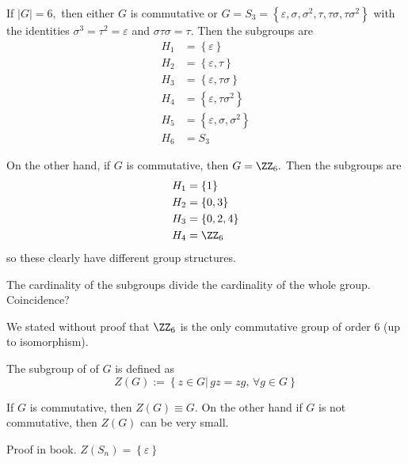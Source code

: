 \documentclass{article}
\begin{document}
\begin{example*}
	If $|G|=6,$ then either $G$ is commutative or $G=S_3=\left\{ \varepsilon, \sigma, \sigma^2, \tau, \tau\sigma, \tau\sigma^2 \right\}$ with the identities $\sigma^3=\tau^2=\varepsilon$ and $\sigma\tau\sigma=\tau.$ Then the subgroups are 
	\begin{align*}
		H_1 &= \left\{ \varepsilon \right\} \\
		H_2 &= \left\{ \varepsilon, \tau \right\} \\
		H_3 &= \left\{ \varepsilon, \tau\sigma \right\} \\
		H_4 &= \left\{ \varepsilon, \tau\sigma^2 \right\} \\
		H_5 &= \left\{ \varepsilon, \sigma, \sigma^2 \right\} \\
		H_6 &= S_3
	\end{align*}

	On the other hand, if $G$ is commutative, then $G=\ZZ_6.$ Then the subgroups are
	\begin{align*}
		H_1 &= \left\{ 1 \right\} \\
		H_2 &= \left\{ 0, 3 \right\} \\
		H_3 &= \left\{ 0, 2, 4 \right\} \\
		H_4 &= \ZZ_6
	\end{align*}
	so these clearly have different group structures.
\end{example*}

\begin{remark*}
	The cardinality of the subgroups divide the cardinality of the whole group. Coincidence?
\end{remark*}

\begin{remark*}
	We stated without proof that $\ZZ_6$ is the only commutative group of order 6 (up to isomorphism).
\end{remark*}

\begin{definition*}
	The subgroup of  of $G$ is defined as \[Z(G) := \left\{ z\in G |\, gz=zg, \, \forall g\in G \right\}\]
\end{definition*}

If $G$ is commutative, then $Z(G)\equiv G.$ On the other hand if $G$ is not commutative, then $Z(G)$ can be very small.

\begin{example*}
	Proof in book. $Z(S_n)=\left\{ \varepsilon \right\}$
\end{example*}
\end{document}
